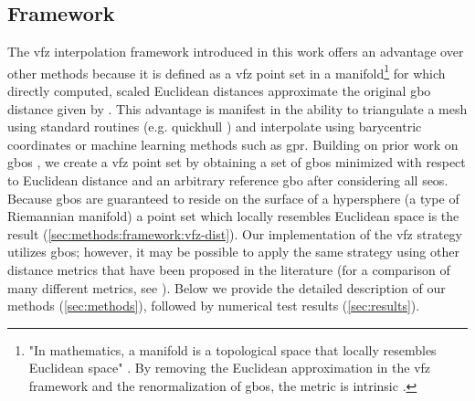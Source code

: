 \documentclass[final,twocolumn,12pt]{elsarticle}
\begin{document}
\subsection{ Framework}
\label{sec:intro:vfzo}
The \gls{vfz} interpolation framework introduced in this work offers an advantage over other methods because it is defined as a \gls{vfz} point set in a manifold\footnote{"In mathematics, a manifold is a topological space that locally resembles Euclidean space" \cite{morawiecDistancesGrainInterfaces2019}. By removing the Euclidean approximation in the \gls{vfz} framework and the renormalization of \glspl{gbo}, the metric is intrinsic \cite{morawiecDistancesGrainInterfaces2019}. } for which directly computed, scaled Euclidean distances approximate the original \gls{gbo} distance given by \citet{francisGeodesicOctonionMetric2019}. This advantage is manifest in the ability to triangulate a mesh using standard routines (e.g. quickhull \cite{barberQuickhullAlgorithmConvex1996}) and interpolate using barycentric coordinates or machine learning methods such as \gls{gpr}. Building on prior work on \glspl{gbo} \cite{francisGeodesicOctonionMetric2019,chesserLearningGrainBoundary2020}, we create a \gls{vfz} point set by obtaining a set of \glspl{gbo} minimized with respect to Euclidean distance and an arbitrary reference \gls{gbo} after considering all \glspl{seo}. Because \glspl{gbo} are guaranteed to reside on the surface of a hypersphere \cite{francisGeodesicOctonionMetric2019} (a type of Riemannian manifold) a point set which locally resembles Euclidean space is the result (\cref{sec:methods:framework:vfz-dist}). Our implementation of the \gls{vfz} strategy utilizes \glspl{gbo}; however, it may be possible to apply the same strategy using other distance metrics that have been proposed in the literature (for a comparison of many different metrics, see \citet{morawiecDistancesGrainInterfaces2019}). Below we provide the detailed description of our methods (\cref{sec:methods}), followed by numerical test results (\cref{sec:results}).
\end{document}
